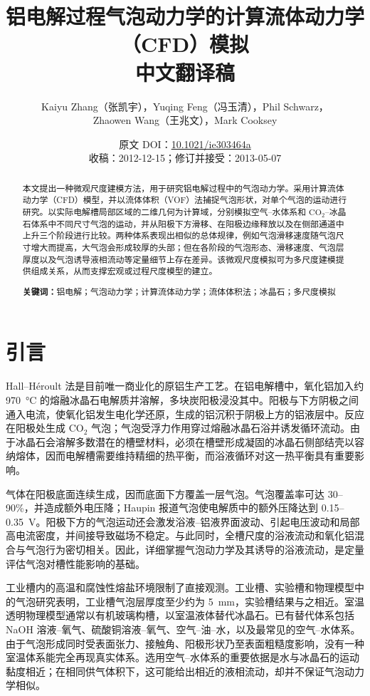 \documentclass[UTF8,11pt,a4paper,fontset=fandol]{ctexart}
\title{铝电解过程气泡动力学的计算流体动力学（CFD）模拟\\\large 中文翻译稿}
\author{Kaiyu Zhang（张凯宇），Yuqing Feng（冯玉清），Phil Schwarz，\\Zhaowen Wang（王兆文），Mark Cooksey}
\date{原文 DOI：\href{https://doi.org/10.1021/ie303464a}{10.1021/ie303464a}\\收稿：2012-12-15；修订并接受：2013-05-07}
\begin{document}
\maketitle

\begin{abstract}
本文提出一种微观尺度建模方法，用于研究铝电解过程中的气泡动力学。采用计算流体动力学（CFD）模型，并以流体体积（VOF）法捕捉气泡形状，对单个气泡的运动进行研究。以实际电解槽局部区域的二维几何为计算域，分别模拟空气--水体系和 $\mathrm{CO_2}$--冰晶石体系中不同尺寸气泡的运动，并从阳极下方滑移、在阳极边缘释放以及在侧部通道中上升三个阶段进行比较。两种体系表现出相似的总体规律，例如气泡滑移速度随气泡尺寸增大而提高，大气泡会形成较厚的头部；但在各阶段的气泡形态、滑移速度、气泡层厚度以及气泡诱导液相流动等定量细节上存在差异。该微观尺度模拟可为多尺度建模提供组成关系，从而支撑宏观或过程尺度模型的建立。

\noindent\textbf{关键词：}铝电解；气泡动力学；计算流体动力学；流体体积法；冰晶石；多尺度模拟
\end{abstract}

\section{引言}
Hall--H\'eroult 法是目前唯一商业化的原铝生产工艺。在铝电解槽中，氧化铝加入约 \SI{970}{\degreeCelsius} 的熔融冰晶石电解质并溶解，多块炭阳极浸没其中。阳极与下方阴极之间通入电流，使氧化铝发生电化学还原，生成的铝沉积于阴极上方的铝液层中。反应在阳极处生成 $\mathrm{CO_2}$ 气泡；气泡受浮力作用穿过熔融冰晶石浴并诱发循环流动。由于冰晶石会溶解多数潜在的槽壁材料，必须在槽壁形成凝固的冰晶石侧部结壳以容纳熔体，因而电解槽需要维持精细的热平衡，而浴液循环对这一热平衡具有重要影响。

气体在阳极底面连续生成，因而底面下方覆盖一层气泡。气泡覆盖率可达 30--90\%，并造成额外电压降；Haupin 报道气泡使电解质中的额外压降达到 0.15--\SI{0.35}{V}。阳极下方的气泡运动还会激发浴液--铝液界面波动、引起电压波动和局部高电流密度，并间接导致磁场不稳定。与此同时，全槽尺度的浴液流动和氧化铝混合与气泡行为密切相关。因此，详细掌握气泡动力学及其诱导的浴液流动，是定量评估气泡对槽性能影响的基础。

工业槽内的高温和腐蚀性熔盐环境限制了直接观测。工业槽、实验槽和物理模型中的气泡研究表明，工业槽气泡层厚度至少约为 \SI{5}{mm}，实验槽结果与之相近。室温透明物理模型通常以有机玻璃构槽，以室温液体替代冰晶石。已有替代体系包括 NaOH 溶液--氧气、硫酸铜溶液--氧气、空气--油--水，以及最常见的空气--水体系。由于气泡形成同时受表面张力、接触角、阳极形状乃至表面粗糙度影响，没有一种室温体系能完全再现真实体系。选用空气--水体系的重要依据是水与冰晶石的运动黏度相近；在相同供气体积下，这可能给出相近的液相流动，却并不保证气泡动力学相似。
\end{document}
